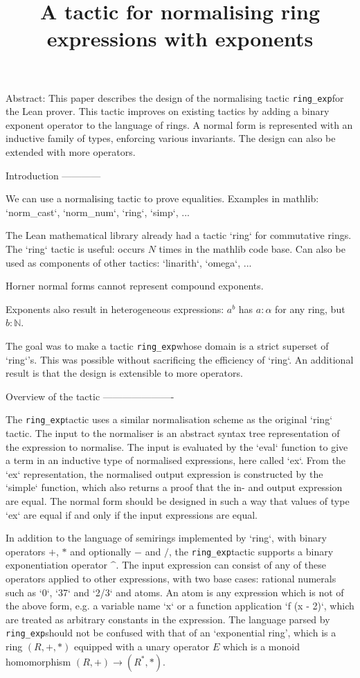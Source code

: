 \documentclass{article}
\title{A tactic for normalising ring expressions with exponents}
\newcommand{\ringexp}{\texttt{ring\_exp}}
\begin{document}
\maketitle

Abstract:
This paper describes the design of the normalising tactic \ringexp for the Lean prover.
This tactic improves on existing tactics by adding a binary exponent operator to the language of rings.
A normal form is represented with an inductive family of types, enforcing various invariants.
The design can also be extended with more operators.

Introduction
------------

We can use a normalising tactic to prove equalities.
Examples in mathlib: `norm\_cast`, `norm\_num`, `ring`, `simp`, ...

The Lean mathematical library already had a tactic `ring` for commutative rings.
The `ring` tactic is useful: occurs $N$ times in the mathlib code base.
Can also be used as components of other tactics: `linarith`, `omega`, ...

Horner normal forms cannot represent compound exponents.

Exponents also result in heterogeneous expressions: $a^b$ has $a : α$ for any ring, but $b : ℕ$.

The goal was to make a tactic \ringexp whose domain is a strict superset of `ring`'s.
This was possible without sacrificing the efficiency of `ring`.
An additional result is that the design is extensible to more operators.

Overview of the tactic
----------------------

The \ringexp tactic uses a similar normalisation scheme as the original `ring` tactic.
The input to the normaliser is an abstract syntax tree representation of the expression to normalise.
The input is evaluated by the `eval` function to give a term in an inductive type of normalised expressions, here called `ex`.
From the `ex` representation, the normalised output expression is constructed by the `simple` function,
which also returns a proof that the in- and output expression are equal.
The normal form should be designed in such a way that values of type `ex` are equal if and only if the input expressions are equal.

In addition to the language of semirings implemented by `ring`, with binary operators $+$, $*$ and optionally $-$ and $/$,
the \ringexp tactic supports a binary exponentiation operator $\^$.
The input expression can consist of any of these operators applied to other expressions,
with two base cases: rational numerals such as `0`, `37` and `2/3` and atoms.
An atom is any expression which is not of the above form, e.g. a variable name `x` or a function application `f (x - 2)`,
which are treated as arbitrary constants in the expression.
The language parsed by \ringexp should not be confused with that of an `exponential ring', which is a ring $(R, +, *)$ equipped with a unary operator $E$ which is a monoid homomorphism $(R, +) \to (R^*, *)$.
\end{document}
